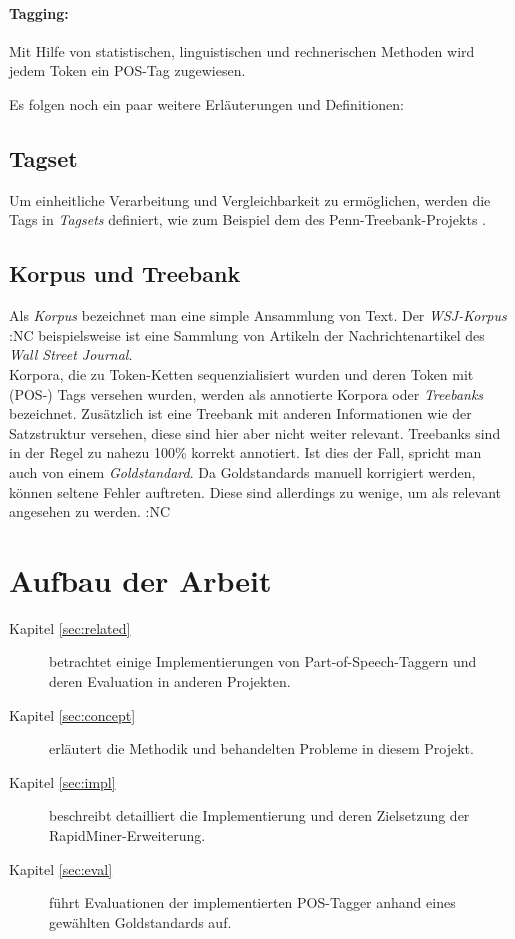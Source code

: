 \paragraph{Tagging:} Mit Hilfe von statistischen, linguistischen und rechnerischen Methoden wird jedem Token ein POS-Tag zugewiesen. 

Es folgen noch ein paar weitere Erläuterungen und Definitionen:

\subsection{Tagset}
\label{sec:intro:pos:tagset}

Um einheitliche Verarbeitung und Vergleichbarkeit zu ermöglichen, werden die Tags in \textit{Tagsets} definiert, wie zum Beispiel dem des Penn-Treebank-Projekts \linebreak \cite{Web:PennBank} \cite{Paper:PennBank}.

\subsection{Korpus und Treebank}
\label{sec:intro:pos:corpus}

Als \textit{Korpus} bezeichnet man eine simple Ansammlung von Text. Der \textit{WSJ-Korpus}  :NC beispielsweise ist eine Sammlung von Artikeln der Nachrichtenartikel des \textit{Wall Street Journal}.
\\
Korpora, die zu Token-Ketten sequenzialisiert wurden und deren Token mit (POS-) Tags versehen wurden, werden als annotierte Korpora oder \textit{Treebanks} bezeichnet. Zusätzlich ist eine Treebank mit anderen Informationen wie der Satzstruktur versehen, diese sind hier aber nicht weiter relevant. Treebanks sind in der Regel zu nahezu 100\% korrekt annotiert. Ist dies der Fall, spricht man auch von einem \textit{Goldstandard}. Da Goldstandards manuell korrigiert werden, können seltene Fehler auftreten. Diese sind allerdings zu wenige, um als relevant angesehen zu werden. :NC




\section{Aufbau der Arbeit}
\label{sec:intro:structure}

\begin{description}

\item[Kapitel \ref{sec:related}] betrachtet einige Implementierungen von Part-of-Speech-Taggern und deren Evaluation in anderen Projekten.
\item[Kapitel \ref{sec:concept}] erläutert die Methodik und behandelten Probleme in diesem Projekt.
\item[Kapitel \ref{sec:impl}] beschreibt detailliert die Implementierung und deren Zielsetzung der RapidMiner-Erweiterung.
\item[Kapitel \ref{sec:eval}] führt Evaluationen der implementierten POS-Tagger anhand eines gewählten Goldstandards auf.

\end{description}

